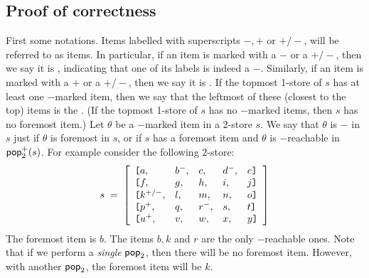 \subsection{Proof of correctness}
First some notations. Items labelled with superscripts $-, +$ or
$+/-$, will be referred to as  items. In
particular, if an item is marked with a $-$ or a $+/-$,
then we say it is , indicating that one of its
labels is indeed a $-$. Similarly, if an item is marked with a $+$
or a $+/-$, then we say it is . If the topmost
1-store of $s$ has at least one $-$marked item, then we say that
the leftmost of these (closest to the top) items is the
. (If the topmost 1-store of $s$ has no
$-$marked items, then $s$ has no foremost item.) Let $\theta$ be a
$-$marked item in a $2$-store $s$. We say that $\theta$ is
$-$ in $s$ just if $\theta$ is foremost in
$s$, or if $s$ has a foremost item and $\theta$ is $-$reachable in
${\sf pop}_2^+(s)$. For example consider the following $2$-store:
\begin{equation}
\nonumber s \; = \; \left [ \begin{array}{lllll}
\hbox{\tt [} a      , & b^- , & c   , & d^- , & e \hbox{\tt ]}\\
\hbox{\tt [} f      , & g   , & h   , & i   , & j \hbox{\tt ]}\\
\hbox{\tt [} k^{+/-}, & l   , & m   , & n   , & o \hbox{\tt ]}\\
\hbox{\tt [} p^+    , & q   , & r^- , & s   , & t \hbox{\tt ]}\\
\hbox{\tt [} u^+    , & v   , & w   , & x   , & y \hbox{\tt ]}
\end{array} \right ]
\end{equation}
The foremost item is $b$. The items $b,k$ and $r$ are the only
$-$reachable ones. Note that if  we perform a \emph{single}
${\sf pop}_2$, then there will be no foremost item. However, with
another ${\sf pop}_2$, the foremost item will be $k$.

